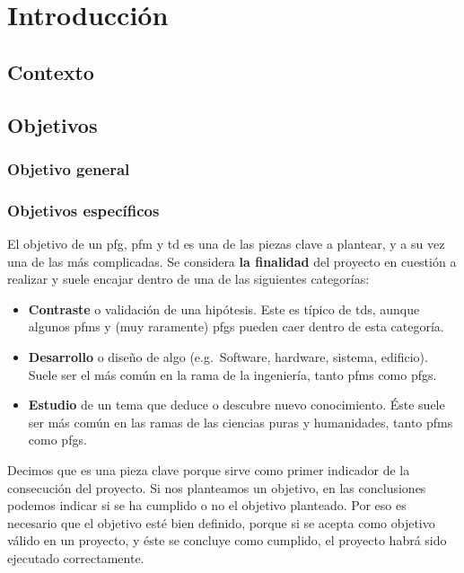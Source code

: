 \chapter{Introducción}
\label{ch:introduccion}

\section{Contexto}

\section{Objetivos}

\subsection{Objetivo general}

\subsection{Objetivos específicos}


El objetivo de un \gls{pfg}, \gls{pfm} y  \gls{td} es una de las piezas clave a plantear, y a su vez una de las más complicadas. Se considera \textbf{la finalidad} del proyecto en cuestión a realizar y suele encajar dentro de una de las siguientes categorías:

\begin{itemize}
    \item \textbf{Contraste} o validación de una hipótesis. Este es típico de \glspl{td}, aunque algunos \glspl{pfm} y (muy raramente) \glspl{pfg} pueden caer dentro de esta categoría.
    \item \textbf{Desarrollo} o diseño de algo (e.g.~Software, hardware, sistema, edificio). Suele ser el más común en la rama de la ingeniería, tanto \glspl{pfm} como \glspl{pfg}.
    \item \textbf{Estudio} de un tema que deduce o descubre nuevo conocimiento. Éste suele ser más común en las ramas de las ciencias puras y humanidades, tanto \glspl{pfm} como \glspl{pfg}.
\end{itemize}

Decimos que es una pieza clave porque sirve como primer indicador de la consecución del proyecto. Si nos planteamos un objetivo, en las conclusiones podemos indicar si se ha cumplido o no el objetivo planteado. Por eso es necesario que el objetivo esté bien definido, porque si se acepta como objetivo válido en un proyecto, y éste se concluye como cumplido, el proyecto habrá sido ejecutado correctamente.

